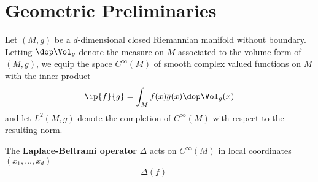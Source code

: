 \section{Geometric Preliminaries}
Let $(M,g)$ be a $d$-dimensional closed Riemannian manifold without boundary.  Letting $\dop \Vol_g$ denote the measure on $M$ associated to the volume form of $(M,g)$, we equip the space $C^\infty(M)$ of smooth complex valued functions on $M$ with the inner product 
\begin{align*}
    \ip{f}{g} = \int_M f(x) \overline{g}(x) \dop \Vol_g(x) 
\end{align*}
and let $L^2(M,g)$ denote the completion of $C^\infty(M)$ with respect to the resulting norm.

The \textbf{Laplace-Beltrami operator} $\Delta$ acts on $C^\infty(M)$ in local coordinates $(x_1,\dots,x_d)$
\begin{align*}
    \Delta(f) = 
\end{align*} 